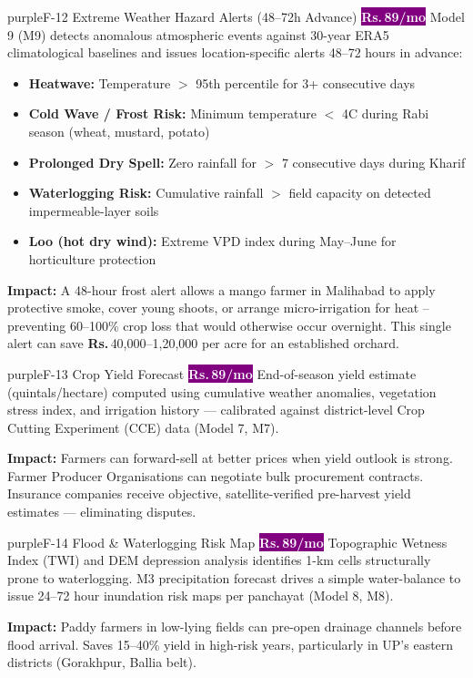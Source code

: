 \documentclass[12pt,a4paper]{article}
\newcommand{\Rup}{\textbf{Rs.\,}}
\newcommand{\probadge}{\textcolor{white}{\colorbox{purple}{\footnotesize\textbf{\Rup89/mo}}}}
\begin{document}
\begin{featurebox}{purple}{F-12 \quad Extreme Weather Hazard Alerts (48--72h Advance) \quad \probadge}
Model 9 (M9) detects anomalous atmospheric events against 30-year ERA5 climatological baselines and issues location-specific alerts 48--72 hours in advance:
\begin{itemize}[leftmargin=*,noitemsep]
  \item \textbf{Heatwave:} Temperature $>$ 95th percentile for 3+ consecutive days
  \item \textbf{Cold Wave / Frost Risk:} Minimum temperature $<$ 4\textdegree C during Rabi season (wheat, mustard, potato)
  \item \textbf{Prolonged Dry Spell:} Zero rainfall for $>$ 7 consecutive days during Kharif
  \item \textbf{Waterlogging Risk:} Cumulative rainfall $>$ field capacity on detected impermeable-layer soils
  \item \textbf{Loo (hot dry wind):} Extreme VPD index during May--June for horticulture protection
\end{itemize}

\textbf{Impact:} A 48-hour frost alert allows a mango farmer in Malihabad to apply protective smoke, cover young shoots, or arrange micro-irrigation for heat -- preventing 60--100\% crop loss that would otherwise occur overnight. This single alert can save \Rup40,000--1,20,000 per acre for an established orchard.
\end{featurebox}

\begin{featurebox}{purple}{F-13 \quad Crop Yield Forecast \quad \probadge}
End-of-season yield estimate (quintals/hectare) computed using cumulative weather anomalies, vegetation stress index, and irrigation history --- calibrated against district-level Crop Cutting Experiment (CCE) data (Model 7, M7).

\textbf{Impact:} Farmers can forward-sell at better prices when yield outlook is strong. Farmer Producer Organisations can negotiate bulk procurement contracts. Insurance companies receive objective, satellite-verified pre-harvest yield estimates --- eliminating disputes.
\end{featurebox}

\begin{featurebox}{purple}{F-14 \quad Flood \& Waterlogging Risk Map \quad \probadge}
Topographic Wetness Index (TWI) and DEM depression analysis identifies 1-km cells structurally prone to waterlogging. M3 precipitation forecast drives a simple water-balance to issue 24--72 hour inundation risk maps per panchayat (Model 8, M8).

\textbf{Impact:} Paddy farmers in low-lying fields can pre-open drainage channels before flood arrival. Saves 15--40\% yield in high-risk years, particularly in UP's eastern districts (Gorakhpur, Ballia belt).
\end{featurebox}
\end{document}

